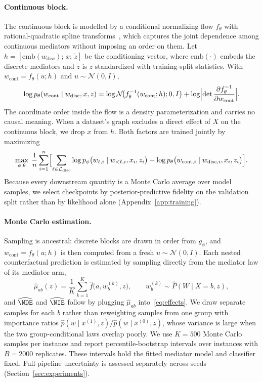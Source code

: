 \paragraph{Continuous block.}
The continuous block is modelled by a conditional normalizing flow $f_\theta$
with rational-quadratic spline transforms~\citep{durkan2019neural}, which
captures the joint dependence among continuous mediators without imposing an
order on them. Let $h=[\mathrm{emb}(w_{\mathrm{disc}});\,x;\,\tilde z]$ be the
conditioning vector, where $\mathrm{emb}(\cdot)$ embeds the discrete mediators
and $\tilde z$ is $z$ standardized with training-split statistics. With
$w_{\mathrm{cont}}=f_\theta(u;h)$ and $u\sim\mathcal N(0,I)$,
\begin{equation}
  \log p_\theta(w_{\mathrm{cont}}\mid w_{\mathrm{disc}},x,z)
  =\log\mathcal N\!\bigl(f_\theta^{-1}(w_{\mathrm{cont}};h);0,I\bigr)
  +\log\Bigl|\det\frac{\partial f_\theta^{-1}}{\partial w_{\mathrm{cont}}}\Bigr|.
  \label{eq:flow_loglik}
\end{equation}
The coordinate order inside the flow is a density parameterization and carries
no causal meaning. When a dataset's graph excludes a direct effect of $X$ on
the continuous block, we drop $x$ from $h$. Both factors are trained jointly by
maximizing
\begin{equation}
  \max_{\phi,\theta}\;\frac1n\sum_{i=1}^n\Bigl[
    \sum_{\ell\in\mathcal L_{\mathrm{disc}}}
      \log p_\phi\bigl(w_{\ell,i}\mid w_{<\ell,i},x_i,z_i\bigr)
    +\log p_\theta\bigl(w_{\mathrm{cont},i}\mid w_{\mathrm{disc},i},x_i,z_i\bigr)
  \Bigr].
  \label{eq:flow_training}
\end{equation}
Because every downstream quantity is a Monte Carlo average over model samples,
we select checkpoints by posterior-predictive fidelity on the validation split
rather than by likelihood alone (Appendix~\ref{app:training}).

\paragraph{Monte Carlo estimation.}
Sampling is ancestral: discrete blocks are drawn in order from $g_\phi$, and
$w_{\mathrm{cont}}=f_\theta(u;h)$ is then computed from a fresh
$u\sim\mathcal N(0,I)$. Each nested counterfactual prediction is estimated by
sampling directly from the mediator law of its mediator arm,
\begin{equation}
  \hat\mu_{ab}(z)=\frac1K\sum_{k=1}^{K}\hat f\bigl(a,w^{(k)}_b,z\bigr),
  \qquad w^{(k)}_b\sim\hat P(W\mid X=b,z),
  \label{eq:mu_mc}
\end{equation}
and $\widehat\NDE$ and $\widehat\NIE$ follow by plugging
$\hat\mu_{ab}$ into~\eqref{eq:effects}. We draw separate samples for each
$b$ rather than reweighting samples from one group with importance ratios
$\hat p(w\mid x^{(1)},z)/\hat p(w\mid x^{(0)},z)$, whose variance is large when
the two group-conditional laws overlap poorly. We use
$K=500$ Monte Carlo samples per instance and report percentile-bootstrap
intervals over instances with $B=2000$ replicates. These intervals hold the
fitted mediator model and classifier fixed. Full-pipeline uncertainty is
assessed separately across seeds (Section~\ref{sec:experiments}).


